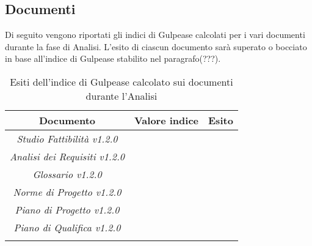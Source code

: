 \subsection{Documenti}
\label{5.2}
Di seguito vengono riportati gli indici di Gulpease calcolati per i vari documenti durante la fase di Analisi. L'esito di ciascun documento sarà superato o bocciato in base all'indice di Gulpease stabilito nel paragrafo(???).

\begin{longtable}{|c|p{3cm}|p{3cm}|}
\toprule
\textbf{Documento} & \textbf{Valore indice} & \textbf{Esito} \\


\midrule
\emph{Studio Fattibilità v1.2.0} & & \\
\midrule
\emph{Analisi dei Requisiti v1.2.0} & & \\
\midrule
\emph{Glossario v1.2.0} & & \\
\midrule
\emph{Norme di Progetto v1.2.0} & & \\
\midrule
\emph{Piano di Progetto v1.2.0} & & \\
\midrule
\emph{Piano di Qualifica v1.2.0} & & \\
\bottomrule
\caption{Esiti dell'indice di Gulpease calcolato sui documenti durante l'Analisi}
\label{tab:changelog}
\end{longtable}
















